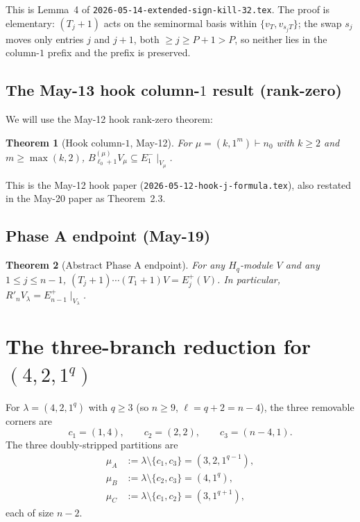 \documentclass[11pt]{article}
\newtheorem{theorem}{Theorem}
\theoremstyle{definition}
\newcommand{\Hq}{H_q}
\begin{document}
This is Lemma~4 of \texttt{2026-05-14-extended-sign-kill-32.tex}.
The proof is elementary: $(T_j+1)$ acts on the seminormal basis
within $\{v_T, v_{s_j T}\}$; the swap $s_j$ moves only entries $j$
and $j+1$, both $\ge j \ge P + 1 > P$, so neither lies in the
column-$1$ prefix and the prefix is preserved.

\subsection{The May-13 hook column-$1$ result (rank-zero)}

We will use the May-12 hook rank-zero theorem:

\begin{theorem}[Hook column-$1$, May-12]\label{thm:hook-E1minus}
For $\mu = (k, 1^m) \vdash n_0$ with $k \ge 2$ and $m \ge \max(k, 2)$,
$B^{(\mu)}_{\ell_0+1} V_\mu \subseteq E_1^-\!\mid_{V_\mu}$.
\end{theorem}

This is the May-12 hook paper (\texttt{2026-05-12-hook-j-formula.tex}),
also restated in the May-20 paper as Theorem~2.3.

\subsection{Phase A endpoint (May-19)}

\begin{theorem}[Abstract Phase A endpoint]\label{thm:phaseA}
For any $\Hq$-module $V$ and any $1 \le j \le n-1$,
$(T_j+1)\cdots(T_1+1) V = E_j^+(V)$.  In particular,
$R'_n V_\lambda = E_{n-1}^+\!\mid_{V_\lambda}$.
\end{theorem}

\section{The three-branch reduction for $(4, 2, 1^q)$}\label{sec:reduction}

For $\lambda = (4, 2, 1^q)$ with $q \ge 3$ (so $n \ge 9$, $\ell = q+2
= n-4$), the three removable corners are
\[
   c_1 = (1, 4), \qquad c_2 = (2, 2), \qquad c_3 = (n-4, 1).
\]
The three doubly-stripped partitions are
\begin{align*}
   \mu_A &:= \lambda \setminus \{c_1, c_3\} = (3, 2, 1^{q-1}), \\
   \mu_B &:= \lambda \setminus \{c_2, c_3\} = (4, 1^q), \\
   \mu_C &:= \lambda \setminus \{c_1, c_2\} = (3, 1^{q+1}),
\end{align*}
each of size $n - 2$.
\end{document}
